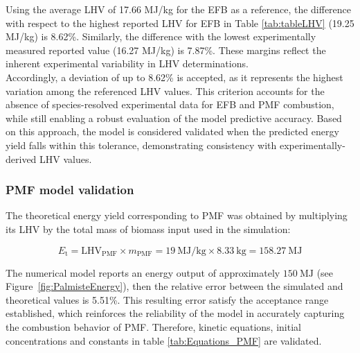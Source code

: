 \documentclass[preprint,12pt]{elsarticle}
\begin{document}


Using the average LHV of 17.66 MJ/kg for the EFB as a reference, the difference with respect to the highest reported LHV for EFB in Table \ref{tab:tableLHV} (19.25 MJ/kg) is 8.62\%. Similarly, the difference with the lowest experimentally measured reported value (16.27 MJ/kg) is 7.87\%. These margins reflect the inherent experimental variability in LHV determinations. \\


Accordingly, a deviation of up to 8.62\% is accepted, as it represents the highest variation among the referenced LHV values. This criterion accounts for the absence of species-resolved experimental data for EFB and PMF combustion, while still enabling a robust evaluation of the model predictive accuracy. Based on this approach, the model is considered validated when the predicted energy yield falls within this tolerance, demonstrating consistency with experimentally-derived LHV values. 

\subsubsection{PMF model validation}


The theoretical energy yield corresponding to PMF was obtained by multiplying its LHV by the total mass of biomass input used in the simulation:

\[
E_{\text{t}} = \text{LHV}_{\text{PMF}} \times m_{\text{PMF}} = 19\ \text{MJ/kg} \times 8.33\ \text{kg} = 158.27\ \text{MJ}
\]

The numerical model reports an energy output of approximately $150\ \text{MJ}$ (see Figure~\ref{fig:PalmisteEnergy}), then the relative error between the simulated and theoretical values is 5.51\%. This resulting error satisfy the acceptance range established, which reinforces the reliability of the model in accurately capturing the combustion behavior of PMF. Therefore, kinetic equations, initial concentrations and constants in table \ref{tab:Equations_PMF} are validated.\\
\end{document}
